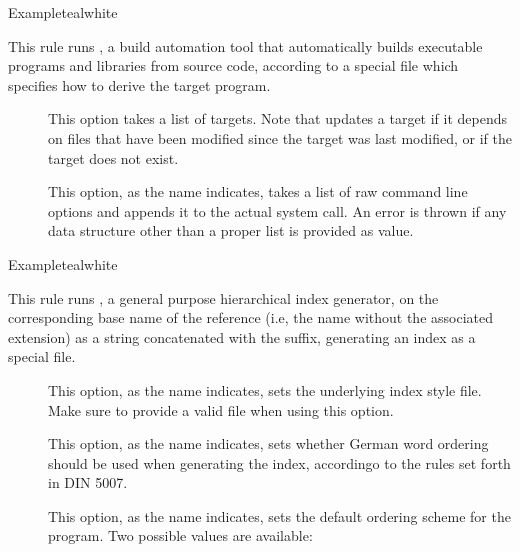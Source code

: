 \begin{description}
\begin{codebox}{Example}{teal}{\icnote}{white}
\end{codebox}

\item[\rulebox{make}{Marco Daniel, Paulo Cereda}] This rule runs , a build automation tool that automatically builds executable programs and libraries from source code, according to a special file which specifies how to derive the target program.

\begin{description}
\item[] This option takes a list of targets. Note that  updates a target if it depends on files that have been modified since the target was last modified, or if the target does not exist.

\item[] This option, as the name indicates, takes a list of raw command line options and appends it to the actual system call. An error is thrown if any data structure other than a proper list is provided as value.
\end{description}

\begin{codebox}{Example}{teal}{\icnote}{white}
\end{codebox}

\item[\rulebox{makeindex}{Marco Daniel, Paulo Cereda}] This rule runs , a gen­eral pur­pose hi­er­ar­chical in­dex gen­er­a­tor, on the corresponding base name of the  reference (i.e, the name without the associated extension) as a string concatenated with the  suffix, generating an index as a special  file.

\begin{description}
\item[] This option, as the name indicates, sets the underlying index style file. Make sure to provide a valid  file when using this option.

\item[] This option, as the name indicates, sets whether German word ordering should be used when generating the index, accordingo to the rules set forth in DIN 5007.

\item[] This option, as the name indicates, sets the default ordering scheme for the  program. Two possible values are available:


\end{description}
\end{description}
